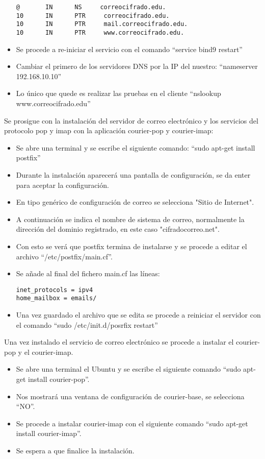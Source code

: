 \documentclass[12pt,oneside,onecolumn,openany]{report}
\begin{document}
\begin{itemize}
\begin{lstlisting}[frame=single]
@       IN      NS     correocifrado.edu.
10      IN      PTR     correocifrado.edu.
10      IN      PTR     mail.correocifrado.edu.
10      IN      PTR     www.correocifrado.edu.
  \end{lstlisting}
  \item Se procede a re-iniciar el servicio con el comando “service bind9 restart”
  \item Cambiar el primero de los servidores DNS por la IP del nuestro: “nameserver 192.168.10.10”
  \item Lo único que quede es realizar las pruebas en el cliente “nslookup www.correocifrado.edu”
\end{itemize}
Se prosigue con la instalación del servidor de correo electrónico y los servicios del protocolo pop y imap con la aplicación courier-pop y courier-imap:
\begin{itemize}
 \item Se abre una terminal y se escribe el siguiente comando: “sudo apt-get install postfix”
 \item Durante la instalación aparecerá una pantalla de configuración, se da enter para aceptar la configuración.
 \item En tipo genérico de configuración de correo se selecciona "Sitio de Internet".
 \item A continuación se indica el nombre de sistema de correo, normalmente la dirección del dominio registrado, en este caso "cifradocorreo.net".
 \item Con esto se verá que postfix termina de instalarse y se procede a editar el archivo “/etc/postfix/main.cf”.
 \item Se añade al final del fichero main.cf las líneas:
 \begin{lstlisting}[frame=single]
  inet_protocols = ipv4
home_mailbox = emails/
 \end{lstlisting}
 \item Una vez guardado el archivo que se edita se procede a reiniciar el servidor con el comando “sudo /etc/init.d/posrfix restart”
\end{itemize}


Una vez instalado el servicio de correo electrónico se procede a instalar el courier-pop y el courier-imap.
\begin{itemize}
 \item Se abre una terminal el Ubuntu y se escribe el siguiente comando “sudo apt-get install courier-pop”.
 \item Nos mostrará una ventana de configuración de courier-base, se selecciona “NO”.
 \item Se procede a instalar courier-imap con el siguiente comando “sudo apt-get install courier-imap”.
 \item Se espera a que finalice la instalación.
\end{itemize}
\end{document}
